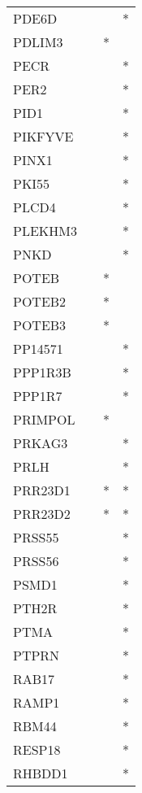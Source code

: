 \begin{longtable}{lccc}
PDE6D          &       &    &       * \\
PDLIM3         &       &  * &         \\
PECR           &       &    &       * \\
PER2           &       &    &       * \\
PID1           &       &    &       * \\
PIKFYVE        &       &    &       * \\
PINX1          &       &    &       * \\
PKI55          &       &    &       * \\
PLCD4          &       &    &       * \\
PLEKHM3        &       &    &       * \\
PNKD           &       &    &       * \\
POTEB          &       &  * &         \\
POTEB2         &       &  * &         \\
POTEB3         &       &  * &         \\
PP14571        &       &    &       * \\
PPP1R3B        &       &    &       * \\
PPP1R7         &       &    &       * \\
PRIMPOL        &       &  * &         \\
PRKAG3         &       &    &       * \\
PRLH           &       &    &       * \\
PRR23D1        &       &  * &       * \\
PRR23D2        &       &  * &       * \\
PRSS55         &       &    &       * \\
PRSS56         &       &    &       * \\
PSMD1          &       &    &       * \\
PTH2R          &       &    &       * \\
PTMA           &       &    &       * \\
PTPRN          &       &    &       * \\
RAB17          &       &    &       * \\
RAMP1          &       &    &       * \\
RBM44          &       &    &       * \\
RESP18         &       &    &       * \\
RHBDD1         &       &    &       * \\

\end{longtable}
